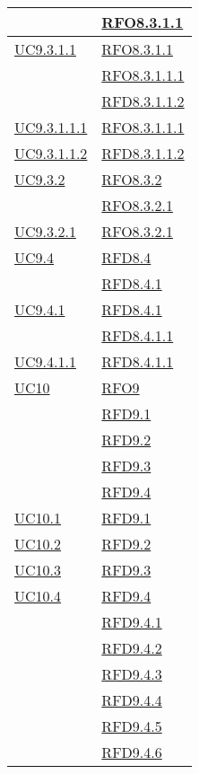 \begin{longtable}{|>{\centering}m{5cm}|m{5cm}<{\centering}|}
& \hyperlink{RFO8.3.1.1}{RFO8.3.1.1}\\ \hline
\hyperref[UC9.3.1.1]{UC9.3.1.1} & \hyperlink{RFO8.3.1.1}{RFO8.3.1.1}\\
& \hyperlink{RFO8.3.1.1.1}{RFO8.3.1.1.1}\\
& \hyperlink{RFD8.3.1.1.2}{RFD8.3.1.1.2}\\ \hline
\hyperref[UC9.3.1.1.1]{UC9.3.1.1.1} & \hyperlink{RFO8.3.1.1.1}{RFO8.3.1.1.1}\\ \hline
\hyperref[UC9.3.1.1.2]{UC9.3.1.1.2} & \hyperlink{RFD8.3.1.1.2}{RFD8.3.1.1.2}\\ \hline
\hyperref[UC9.3.2]{UC9.3.2} & \hyperlink{RFO8.3.2}{RFO8.3.2}\\
& \hyperlink{RFO8.3.2.1}{RFO8.3.2.1}\\ \hline
\hyperref[UC9.3.2.1]{UC9.3.2.1} & \hyperlink{RFO8.3.2.1}{RFO8.3.2.1}\\ \hline
\hyperref[UC9.4]{UC9.4} & \hyperlink{RFD8.4}{RFD8.4}\\
& \hyperlink{RFD8.4.1}{RFD8.4.1}\\ \hline
\hyperref[UC9.4.1]{UC9.4.1} & \hyperlink{RFD8.4.1}{RFD8.4.1}\\
& \hyperlink{RFD8.4.1.1}{RFD8.4.1.1}\\ \hline
\hyperref[UC9.4.1.1]{UC9.4.1.1} & \hyperlink{RFD8.4.1.1}{RFD8.4.1.1}\\ \hline
\hyperref[UC10]{UC10} & \hyperlink{RFO9}{RFO9}\\
& \hyperlink{RFD9.1}{RFD9.1}\\
& \hyperlink{RFD9.2}{RFD9.2}\\
& \hyperlink{RFD9.3}{RFD9.3}\\
& \hyperlink{RFD9.4}{RFD9.4}\\ \hline
\hyperref[UC10.1]{UC10.1} & \hyperlink{RFD9.1}{RFD9.1}\\ \hline
\hyperref[UC10.2]{UC10.2} & \hyperlink{RFD9.2}{RFD9.2}\\ \hline
\hyperref[UC10.3]{UC10.3} & \hyperlink{RFD9.3}{RFD9.3}\\ \hline
\hyperref[UC10.4]{UC10.4} & \hyperlink{RFD9.4}{RFD9.4}\\
& \hyperlink{RFD9.4.1}{RFD9.4.1}\\
& \hyperlink{RFD9.4.2}{RFD9.4.2}\\
& \hyperlink{RFD9.4.3}{RFD9.4.3}\\
& \hyperlink{RFD9.4.4}{RFD9.4.4}\\
& \hyperlink{RFD9.4.5}{RFD9.4.5}\\
& \hyperlink{RFD9.4.6}{RFD9.4.6}\\

\end{longtable}
